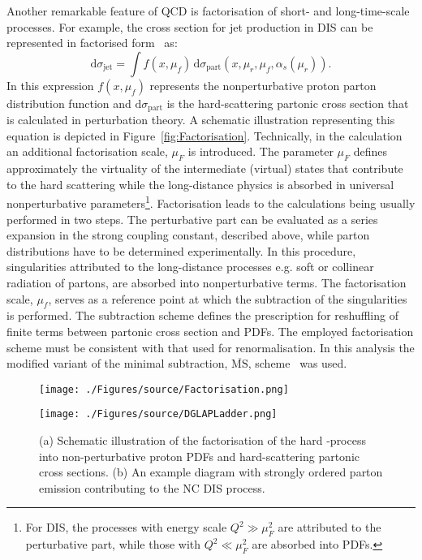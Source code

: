 Another remarkable feature of QCD is factorisation of short- and long-time-scale processes. For example, the cross section for jet production in DIS can be represented in factorised form~\cite{Collins:1989gx} as:
\begin{equation}
 \mathrm{d}\sigma_{\mathrm{jet}} = \int{f\left(x,\mu_f\right)}\, \mathrm{d}\sigma_{\mathrm{part}}\left(x,\mu_r, \mu_f, \alpha_s\left(\mu_r\right) \right).
\label{eq:disfactorisation}
\end{equation} 
In this expression $f\left(x,\mu_f\right)$ represents the nonperturbative proton parton distribution function and $\mathrm{d}\sigma_{\mathrm{part}}$ is the hard-scattering partonic cross section that is calculated in perturbation theory. A schematic illustration representing this equation is depicted in Figure~\ref{fig:Factorisation}. Technically, in the calculation an additional factorisation scale, $\mu_F$ is introduced. The parameter $\mu_F$ defines approximately the virtuality of the intermediate (virtual) states that contribute to the hard scattering while the long-distance physics is absorbed in universal nonperturbative parameters\footnote{For DIS, the processes with energy scale $Q^2 \gg \mu_F^2 $ are attributed to the perturbative part, while those with $Q^2 \ll \mu_F^2 $ are absorbed into PDFs.}. Factorisation leads to the calculations being usually performed in two steps. The perturbative part can be evaluated as a series expansion in the strong coupling constant, described above, while parton distributions have to be determined experimentally. In this procedure, singularities attributed to the long-distance processes e.g. soft or collinear radiation of partons, are absorbed into nonperturbative terms. The factorisation scale, $\mu_f$, serves as a reference point at which the subtraction of the singularities is performed. The subtraction scheme defines the prescription for reshuffling of finite terms between partonic cross section and PDFs. The employed factorisation scheme must be consistent with that used for renormalisation. In this analysis the modified variant of the minimal subtraction, $\overline{\mathrm{MS}}$, scheme~\cite{Bardeen:1978yd} was used.
\begin{figure}[t]
	\centering
	\begin{subfloat}[]{
		\texttt{[image: ./Figures/source/Factorisation.png]}
		\label{fig:Factorisation}
	 }%
	\end{subfloat}
	\begin{subfloat}[]{
		\texttt{[image: ./Figures/source/DGLAPLadder.png]}
		\label{fig:DGLAPLadder}
	}%
	\end{subfloat}
	\caption{(a) Schematic illustration of the factorisation of the hard \ep-process into non-perturbative proton PDFs and hard-scattering partonic cross sections. (b) An example diagram with strongly ordered parton emission contributing to the NC DIS process.}
	\label{fig:factorisationdglapladder}
\end{figure}
